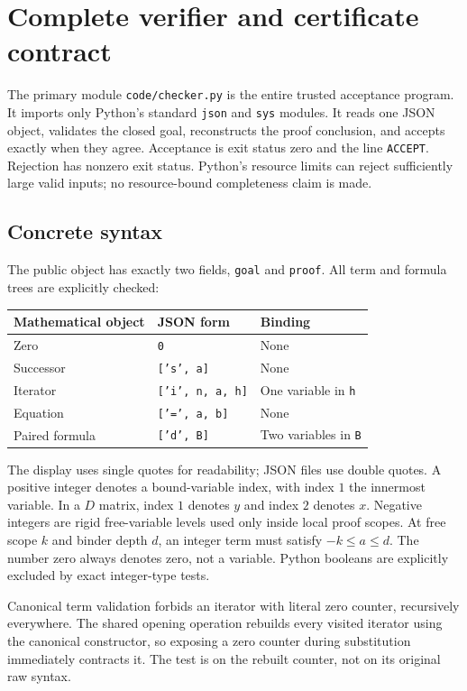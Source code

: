 \section{Complete verifier and certificate contract}
\label{sec:implementation}

The primary module \texttt{code/checker.py} is the entire trusted
acceptance program. It imports only Python's standard \texttt{json} and
\texttt{sys} modules. It reads one JSON object, validates the closed goal,
reconstructs the proof conclusion, and accepts exactly when they agree.
Acceptance is exit status zero and the line \texttt{ACCEPT}. Rejection
has nonzero exit status. Python's resource limits can reject sufficiently
large valid inputs; no resource-bound completeness claim is made.

\subsection{Concrete syntax}

The public object has exactly two fields, \texttt{goal} and
\texttt{proof}. All term and formula trees are explicitly checked:
\begin{center}
\begin{tabular}{lll}
\toprule
Mathematical object & JSON form & Binding\\
\midrule
Zero & \texttt{0} & None\\
Successor & \texttt{['s', a]} & None\\
Iterator & \texttt{['i', n, a, h]} & One variable in \texttt{h}\\
Equation & \texttt{['=', a, b]} & None\\
Paired formula & \texttt{['d', B]} & Two variables in \texttt{B}\\
\bottomrule
\end{tabular}
\end{center}
The display uses single quotes for readability; JSON files use double
quotes. A positive integer denotes a bound-variable index, with
index \(1\) the innermost variable. In a \(D\) matrix, index \(1\)
denotes \(y\) and index \(2\) denotes \(x\). Negative integers are
rigid free-variable levels used only inside local proof scopes.
At free scope \(k\) and binder depth \(d\), an integer term must satisfy
\(-k\leq a\leq d\). The number zero always denotes zero, not a variable.
Python booleans are explicitly excluded by exact integer-type tests.

Canonical term validation forbids an iterator with literal zero
counter, recursively everywhere. The shared opening operation rebuilds
every visited iterator using the canonical constructor, so exposing a
zero counter during substitution immediately contracts it. The test is
on the rebuilt counter, not on its original raw syntax.

